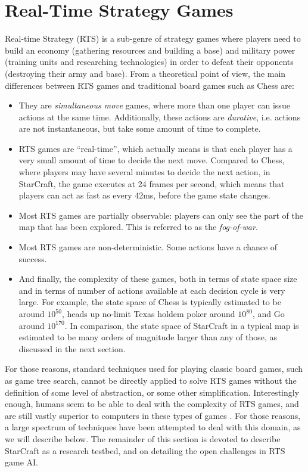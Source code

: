 \documentclass[journal]{IEEEtran}
\begin{document}

\section{Real-Time Strategy Games}\label{sec:rts}

Real-time Strategy (RTS) is a sub-genre of strategy games where players need to build an economy (gathering resources and building a base) and military power (training units and researching technologies) in order to defeat their opponents (destroying their army and base). From a theoretical point of view, the main differences between RTS games and traditional board games such as Chess are:

\begin{itemize}
\item They are {\em simultaneous move} games, where more than one player can issue actions at the same time. Additionally, these actions are {\em durative}, i.e. actions are not instantaneous, but take some amount of time to complete.
\item RTS games are ``real-time'', which actually means is that each player has a very small amount of time to decide the next move. Compared to Chess, where players may have several minutes to decide the next action, in StarCraft, the game executes at 24 frames per second, which means that players can act as fast as every 42ms, before the game state changes.
\item Most RTS games are partially observable: players can only see the part of the map that has been explored. This is referred to as the {\em fog-of-war}.
\item Most RTS games are non-deterministic. Some actions have a chance of success.
\item And finally, the complexity of these games, both in terms of state space size and in terms of number of actions available at each decision cycle is very large. For example, the state space of Chess is typically estimated to be around $10^{50}$, heads up no-limit Texas holdem poker around $10^{80}$, and Go around $10^{170}$. In comparison, the state space of StarCraft in a typical map is estimated to be many orders of magnitude larger than any of those, as discussed in the next section.
\end{itemize}

For those reasons, standard techniques used for playing classic board games, such as game tree search, cannot be directly applied to solve RTS games without the definition of some level of abstraction, or some other simplification. Interestingly enough, humans seem to be able to deal with the complexity of RTS games, and are still vastly superior to computers in these types of games \cite{burochurchill2012aimagazine}. For those reasons, a large spectrum of techniques have been attempted to deal with this domain, as we will describe below. The remainder of this section is devoted to describe StarCraft as a research testbed, and on detailing the open challenges in RTS game AI.
\end{document}
